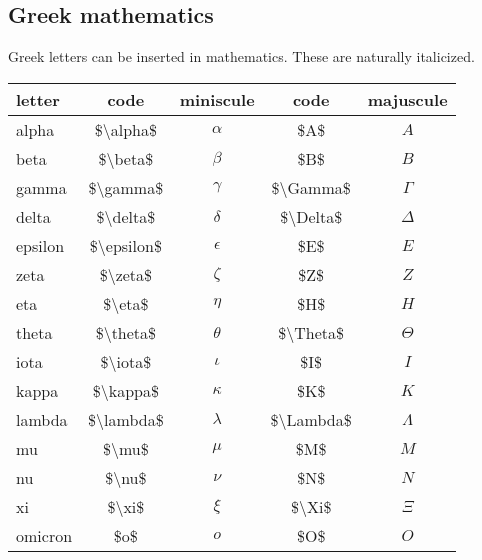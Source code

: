 \documentclass[10pt, letterpaper, twoside]{article}
\begin{document}
\newpage
\subsection{Greek mathematics}\label{sec:greek_mathematics}

Greek letters can be inserted in mathematics. These are naturally italicized.

\begin{table}[H]
\begin{flushleft}
\begin{tabular}{lcccc}
\toprule
letter & code & miniscule & code & majuscule \\
\midrule
alpha   & \$\textbackslash alpha\$   & $\alpha$   & \$A\$                      & $A$ \\
beta    & \$\textbackslash beta\$    & $\beta$    & \$B\$                      & $B$ \\
gamma   & \$\textbackslash gamma\$   & $\gamma$   & \$\textbackslash Gamma\$   & $\Gamma$ \\
delta   & \$\textbackslash delta\$   & $\delta$   & \$\textbackslash Delta\$   & $\Delta$ \\
epsilon & \$\textbackslash epsilon\$ & $\epsilon$ & \$E\$                      & $E$ \\
zeta    & \$\textbackslash zeta\$    & $\zeta$    & \$Z\$                      & $Z$ \\
eta     & \$\textbackslash eta\$     & $\eta$     & \$H\$                      & $H$ \\
theta   & \$\textbackslash theta\$   & $\theta$   & \$\textbackslash Theta\$   & $\Theta$ \\
iota    & \$\textbackslash iota\$    & $\iota$    & \$I\$                      & $I$ \\
kappa   & \$\textbackslash kappa\$   & $\kappa$   & \$K\$                      & $K$ \\
lambda  & \$\textbackslash lambda\$  & $\lambda$  & \$\textbackslash Lambda\$  & $\Lambda$ \\
mu      & \$\textbackslash mu\$      & $\mu$      & \$M\$                      & $M$ \\
nu      & \$\textbackslash nu\$      & $\nu$      & \$N\$                      & $N$ \\
xi      & \$\textbackslash xi\$      & $\xi$      & \$\textbackslash Xi\$      & $\Xi$ \\
omicron & \$o\$                      & $o$        & \$O\$                      & $O$ \\

\end{tabular}
\end{flushleft}
\end{table}
\end{document}
